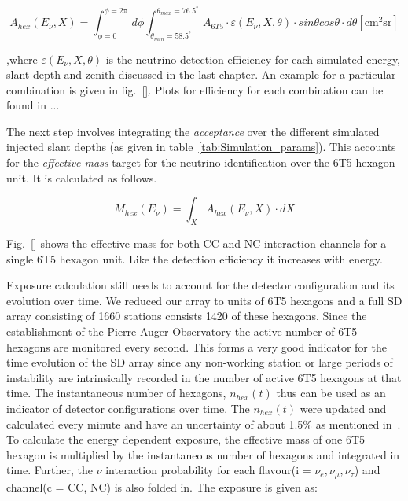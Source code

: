 \begin{equation}
  \label{eq:nu_accep}
  A_{hex}(E_{\nu}, X)  = \int^{\phi = 2\pi}_{\phi = 0} \,d\phi \int_{\theta_{min} = 58.5^{\circ}}^{\theta_{max}= 76.5^{\circ}}  \, A_{6T5} \cdot \varepsilon(E_{\nu}, X, \theta) \cdot sin\theta cos\theta \cdot d\theta    \mathrm{[cm^2 sr]}
\end{equation}

,where $\varepsilon(E_{\nu}, X, \theta)$ is the neutrino detection efficiency for each simulated energy, slant depth and zenith discussed in the last chapter. An example for a particular combination is given in fig.~\ref{}. Plots for efficiency for each combination can be found in ... 

The next step involves integrating the \textit{acceptance} over the different simulated injected slant depths (as given in table~\ref{tab:Simulation_params}). This accounts for the \textit{effective mass} target for the neutrino identification over the 6T5 hexagon unit. It is calculated as follows. 

\begin{equation}
  \label{eq:nu_eff_mass}
  M_{hex}(E_{\nu}) = \int_X A_{hex}(E_{\nu}, X) \cdot dX
\end{equation}

Fig.~\ref{} shows the effective mass for both CC and NC interaction channels for a single 6T5 hexagon unit. Like the detection efficiency it increases with energy. 

Exposure calculation still needs to account for the detector configuration and its evolution over time. We reduced our array to units of 6T5 hexagons and a full SD array consisting of 1660 stations consists 1420 of these hexagons. Since the establishment of the Pierre Auger Observatory the active number of 6T5 hexagons are monitored every second. This forms a very good indicator for the time evolution of the SD array since any non-working station or large periods of instability are intrinsically recorded in the number of active 6T5 hexagons at that time. The instantaneous number of hexagons, $n_{hex}(t)$ thus can be used as an indicator of detector configurations over time. The $n_{hex}(t)$ were updated and calculated every minute and have an uncertainty of about 1.5\% as mentioned in~\cite{PierreAuger:2010zof}. To calculate the energy dependent exposure, the effective mass of one 6T5 hexagon is multiplied by the instantaneous number of hexagons and integrated in time. Further, the $\nu$ interaction probability for each flavour(i = $\nu_e, \nu_{\mu}, \nu_{\tau}$) and channel(c = CC, NC) is also folded in. The exposure is given as:

